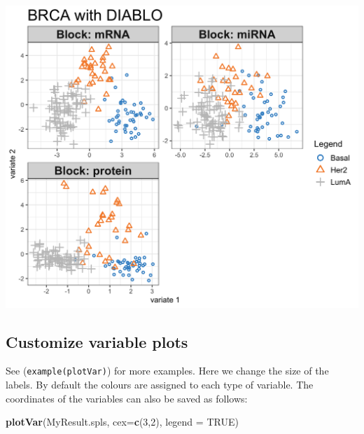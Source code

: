 \documentclass[]{book}
\newenvironment{Shaded}{\begin{snugshade}}{\end{snugshade}}
\newcommand{\KeywordTok}[1]{\textcolor[rgb]{0.13,0.29,0.53}{\textbf{#1}}}
\newcommand{\DataTypeTok}[1]{\textcolor[rgb]{0.13,0.29,0.53}{#1}}
\newcommand{\DecValTok}[1]{\textcolor[rgb]{0.00,0.00,0.81}{#1}}
\newcommand{\StringTok}[1]{\textcolor[rgb]{0.31,0.60,0.02}{#1}}
\newcommand{\OtherTok}[1]{\textcolor[rgb]{0.56,0.35,0.01}{#1}}
\newcommand{\OperatorTok}[1]{\textcolor[rgb]{0.81,0.36,0.00}{\textbf{#1}}}
\newcommand{\NormalTok}[1]{#1}
\theoremstyle{definition}
\theoremstyle{definition}
\theoremstyle{definition}
\theoremstyle{remark}
\begin{document}
\begin{Shaded}
\end{Shaded}

\begin{center}\includegraphics[width=0.5\linewidth]{Figures/unnamed-chunk-4-1} \end{center}

\subsection{Customize variable plots}\label{pls:plotVar}

See (\texttt{example(plotVar)}) for more examples. Here we change the
size of the labels. By default the colours are assigned to each type of
variable. The coordinates of the variables can also be saved as follows:

\begin{Shaded}
\begin{Highlighting}[]
\KeywordTok{plotVar}\NormalTok{(MyResult.spls, }\DataTypeTok{cex=}\KeywordTok{c}\NormalTok{(}\DecValTok{3}\NormalTok{,}\DecValTok{2}\NormalTok{), }\DataTypeTok{legend =} \OtherTok{TRUE}\NormalTok{)}
\end{Highlighting}
\end{Shaded}
\end{document}
